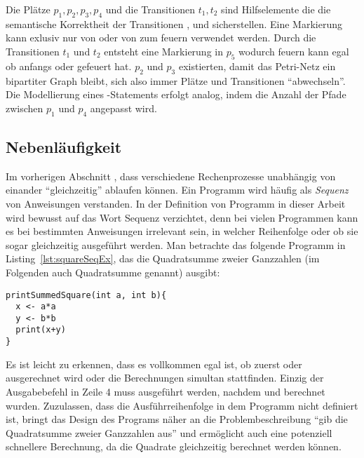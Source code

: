 Die Plätze $p_1,p_2,p_3,p_4$ und die Transitionen $t_1,t_2$ sind Hilfselemente die die semantische Korrektheit der Transitionen ,  und  sicherstellen. Eine Markierung kann exlusiv nur von  oder von  zum feuern verwendet werden. Durch die Transitionen $t_1$ und $t_2$ entsteht eine Markierung in $p_5$ wodurch  feuern kann egal ob anfangs  oder  gefeuert hat. $p_2$ und $p_3$ existierten, damit das Petri-Netz ein bipartiter Graph bleibt, sich also immer Plätze und Transitionen \enquote{abwechseln}. Die Modellierung eines -Statements erfolgt analog, indem die Anzahl der Pfade zwischen $p_1$ und $p_4$ angepasst wird.

\subsection{Nebenläufigkeit}\label{sec:nebenl}
Im vorherigen Abschnitt , dass verschiedene Rechenprozesse unabhängig von einander \enquote{gleichzeitig} ablaufen können. Ein Programm wird häufig als \emph{Sequenz} von Anweisungen verstanden. In der Definition von Programm in dieser Arbeit wird bewusst auf das Wort Sequenz verzichtet, denn bei vielen Programmen kann es bei bestimmten Anweisungen irrelevant sein, in welcher Reihenfolge oder ob sie sogar gleichzeitig ausgeführt werden. Man betrachte das folgende Programm in Listing~\ref{lst:squareSeqEx}, das die Quadratsumme zweier Ganzzahlen (im Folgenden auch Quadratsumme genannt) ausgibt: 
\begin{lstlisting}[caption={Beispiel eines Programms das die Summe von Quadraten zweier Ganzzahlen berechnet. Die Berechnung der Quadratzahlen wird nacheinander in einer fest definierten Sequenz durchgeführt.}, label={lst:squareSeqEx}]
printSummedSquare(int a, int b){
  x <- a*a
  y <- b*b
  print(x+y)
}
\end{lstlisting}
Es ist leicht zu erkennen, dass es vollkommen egal ist, ob zuerst  oder  ausgerechnet wird oder die Berechnungen simultan stattfinden. Einzig der Ausgabebefehl in Zeile 4 muss ausgeführt werden, nachdem  und  berechnet wurden. Zuzulassen, dass die Ausführreihenfolge in dem Programm nicht definiert ist, bringt das Design des Programs näher an die Problembeschreibung \enquote{gib die Quadratsumme zweier Ganzzahlen aus} und ermöglicht auch eine potenziell schnellere Berechnung, da die Quadrate gleichzeitig berechnet werden können.


